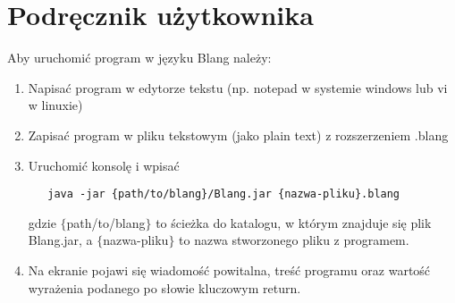 \documentclass[a4paper,10pt]{article}
\begin{document}
\newpage

\section{Podręcznik użytkownika}
Aby uruchomić program w języku Blang należy:
\begin{enumerate}
 \item Napisać program w edytorze tekstu (np. notepad w systemie windows lub vi w linuxie)
 \item Zapisać program w pliku tekstowym (jako plain text) z rozszerzeniem .blang
 \item Uruchomić konsolę i wpisać
  \begin{verbatim}
   java -jar {path/to/blang}/Blang.jar {nazwa-pliku}.blang
  \end{verbatim}
  gdzie $\{$path/to/blang$\}$ to ścieżka do katalogu, w którym znajduje się plik Blang.jar, a $\{$nazwa-pliku$\}$ to nazwa stworzonego pliku z programem.
 \item Na ekranie pojawi się wiadomość powitalna, treść programu oraz wartość wyrażenia podanego po słowie kluczowym return.
\end{enumerate}
\end{document}
